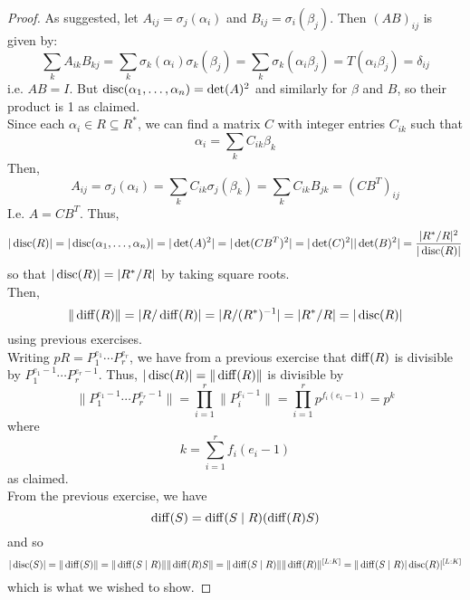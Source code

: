 \begin{proof}
	As suggested, let $A_{ij} = \sigma_j(\alpha_i)$ and $B_{ij} = \sigma_i(\beta_j)$. Then $(AB)_{ij}$ is given by:
	\[ \sum_k A_{ik}B_{kj} = \sum_k \sigma_k(\alpha_i)\sigma_k(\beta_j) = \sum_k \sigma_k(\alpha_i\beta_j) = T(\alpha_i\beta_j) = \delta_{ij} \]
	i.e. $AB = I$. But $\operatorname{disc}(\alpha_1,\ldots,\alpha_n) = \det(A)^2$ and similarly for $\beta$ and $B$, so their product is 1 as claimed. \\
	
	Since each $\alpha_i \in R \subseteq R^\ast$, we can find a matrix $C$ with integer entries $C_{ik}$ such that
	\[ \alpha_i = \sum_k C_{ik}\beta_k \]
	Then,
	\[ A_{ij} = \sigma_j(\alpha_i) = \sum_k C_{ik}\sigma_j(\beta_k) = \sum_k C_{ik}B_{jk} = (CB^T)_{ij} \]
	I.e. $A = CB^T$. Thus,
	\[ |\operatorname{disc}(R)| = |\operatorname{disc}(\alpha_1,\ldots,\alpha_n)| = |\det(A)^2| = |\det(CB^T)^2| = |\det(C)^2||\det(B)^2| = \frac{|R^\ast/R|^2}{|\operatorname{disc}(R)|} \]
	so that $|\operatorname{disc}(R)| = |R^\ast/R|$ by taking square roots. \\
	
	Then,
	\[ \|\operatorname{diff}(R)\| = |R/\operatorname{diff}(R)| = |R/(R^\ast)^{-1}| = |R^\ast/R| = |\operatorname{disc}(R)| \]
	using previous exercises. \\
	
	Writing $pR = P_1^{e_1} \cdots P_r^{e_r}$, we have from a previous exercise that $\operatorname{diff}(R)$ is divisible by $P_1^{e_1-1} \cdots P_r^{e_r-1}$. Thus, $|\operatorname{disc}(R)| = \|\operatorname{diff}(R)\|$ is divisible by
	\[ \|P_1^{e_1-1} \cdots P_r^{e_r-1}\| = \prod_{i=1}^r \|P_i^{e_i-1}\| = \prod_{i=1}^r p^{f_i(e_i-1)} = p^k \]
	where
	\[ k = \sum_{i=1}^r f_i(e_i-1) \]
	as claimed. \\
	
	From the previous exercise, we have
	\[ \operatorname{diff}(S) = \operatorname{diff}(S \mid R)(\operatorname{diff}(R)S) \]
	and so
	\[ |\operatorname{disc}(S)| = \|\operatorname{diff}(S)\| = \|\operatorname{diff}(S \mid R)\|\|\operatorname{diff}(R)S\| = \|\operatorname{diff}(S \mid R)\|\|\operatorname{diff}(R)\|^{[L:K]} = \|\operatorname{diff}(S \mid R)|\operatorname{disc}(R)|^{[L:K]} \]
	which is what we wished to show.
\end{proof}
